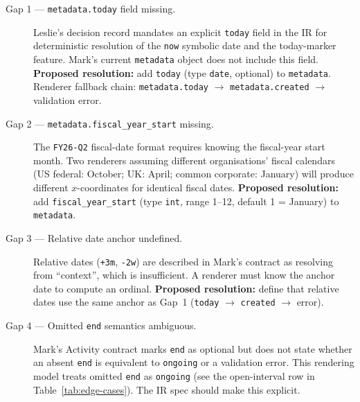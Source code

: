 \begin{description}
  \item[Gap 1 --- \texttt{metadata.today} field missing.]
    Leslie's decision record mandates an explicit \texttt{today} field in the IR for
    deterministic resolution of the \texttt{now} symbolic date and the today-marker
    feature. Mark's current \texttt{metadata} object does not include this field.
    \textbf{Proposed resolution:} add \texttt{today} (type \texttt{date}, optional) to
    \texttt{metadata}. Renderer fallback chain:
    \texttt{metadata.today} $\to$ \texttt{metadata.created} $\to$ validation error.

  \item[Gap 2 --- \texttt{metadata.fiscal\_year\_start} missing.]
    The \texttt{FY26-Q2} fiscal-date format requires knowing the fiscal-year start month.
    Two renderers assuming different organisations' fiscal calendars (US federal: October;
    UK: April; common corporate: January) will produce different $x$-coordinates for
    identical fiscal dates.
    \textbf{Proposed resolution:} add \texttt{fiscal\_year\_start} (type \texttt{int},
    range 1--12, default 1 = January) to \texttt{metadata}.

  \item[Gap 3 --- Relative date anchor undefined.]
    Relative dates (\texttt{+3m}, \texttt{-2w}) are described in Mark's contract as
    resolving from ``context'', which is insufficient. A renderer must know the anchor date
    to compute an ordinal.
    \textbf{Proposed resolution:} define that relative dates use the same anchor as Gap~1
    (\texttt{today} $\to$ \texttt{created} $\to$ error).

  \item[Gap 4 --- Omitted \texttt{end} semantics ambiguous.]
    Mark's Activity contract marks \texttt{end} as optional but does not state whether an
    absent \texttt{end} is equivalent to \texttt{ongoing} or a validation error. This
    rendering model treats omitted \texttt{end} as \texttt{ongoing} (see the open-interval
    row in Table~\ref{tab:edge-cases}). The IR spec should make this explicit.
\end{description}
